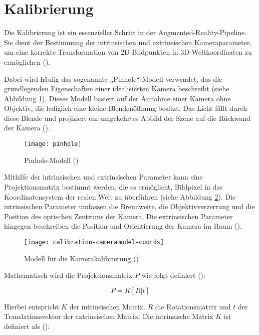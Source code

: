 \section{Kalibrierung}

Die Kalibrierung ist ein essenzieller Schritt in der Augmented-Reality-Pipeline. Sie dient der Bestimmung der intrinsischen und extrinsischen Kameraparameter, um eine korrekte Transformation von 2D-Bildpunkten in 3D-Weltkoordinaten zu ermöglichen (\cite{mw2024calibration}).

Dabei wird häufig das sogenannte „Pinhole“-Modell verwendet, das die grundlegenden Eigenschaften einer idealisierten Kamera beschreibt (siehe Abbildung \ref{fig:Pinhole}). Dieses Modell basiert auf der Annahme einer Kamera ohne Objektiv, die lediglich eine kleine Blendenöffnung besitzt. Das Licht fällt durch diese Blende und projiziert ein umgekehrtes Abbild der Szene auf die Rückwand der Kamera (\cite{mw2024calibration}).

\begin{figure}
    \centering
    \texttt{[image: pinhole]}
    \caption{Pinhole-Modell (\cite{mw2024calibration})\label{fig:Pinhole}}\par
\end{figure}

Mithilfe der intrinsischen und extrinsischen Parameter kann eine Projektionsmatrix bestimmt werden, die es ermöglicht, Bildpixel in das Koordinatensystem der realen Welt zu überführen (siehe Abbildung \ref{fig:Kalibrierung}). Die intrinsischen Parameter umfassen die Brennweite, die Objektivverzerrung und die Position des optischen Zentrums der Kamera. Die extrinsischen Parameter hingegen beschreiben die Position und Orientierung der Kamera im Raum (\cite{mw2024calibration}).

\begin{figure}
    \centering
    \texttt{[image: calibration-cameramodel-coords]}
    \caption{Modell für die Kamerakalibrierung (\cite{mw2024calibration})\label{fig:Kalibrierung}}\par
\end{figure}

Mathematisch wird die Projektionsmatrix \(P\) wie folgt definiert (\cite{mw2024calibration, szeliski2022computerVision}):

\[
P = K[R|t]
\]

Hierbei entspricht \(K\) der intrinsischen Matrix. \(R\) die Rotationsmatrix und \(t\) der Translationsvektor der extrinsischen Matrix. Die intrinsische Matrix \(K\) ist definiert als (\cite{mw2024calibration}):


